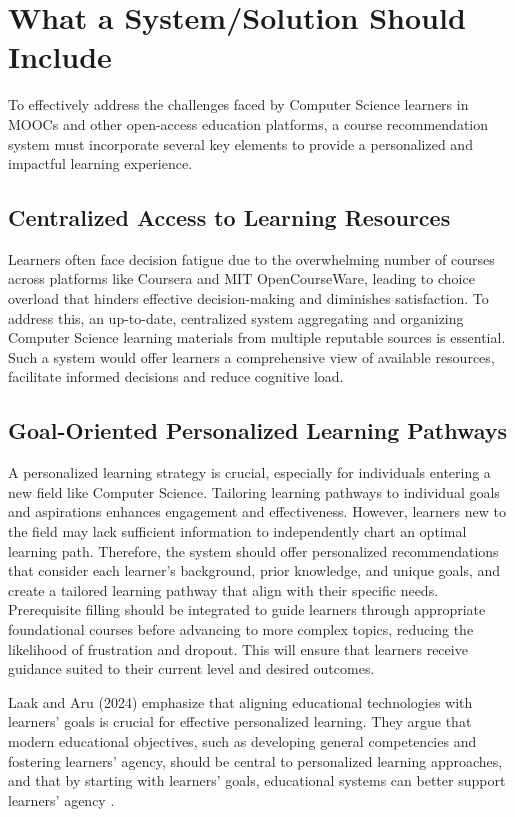 \section{What a System/Solution Should Include}

To effectively address the challenges faced by Computer Science learners in MOOCs and other open-access education platforms, a course recommendation system must incorporate several key elements to provide a personalized and impactful learning experience.

\subsection{Centralized Access to Learning Resources}

Learners often face decision fatigue due to the overwhelming number of courses across platforms like Coursera and MIT OpenCourseWare, leading to choice overload that hinders effective decision-making and diminishes satisfaction. To address this, an up-to-date, centralized system aggregating and organizing Computer Science learning materials from multiple reputable sources is essential. Such a system would offer learners a comprehensive view of available resources, facilitate informed decisions and reduce cognitive load.

\subsection{Goal-Oriented Personalized Learning Pathways}

A personalized learning strategy is crucial, especially for individuals entering a new field like Computer Science. Tailoring learning pathways to individual goals and aspirations enhances engagement and effectiveness. However, learners new to the field may lack sufficient information to independently chart an optimal learning path. Therefore, the system should offer personalized recommendations that consider each learner's background, prior knowledge, and unique goals, and create a tailored learning pathway that align with their specific needs. Prerequisite filling should be integrated to guide learners through appropriate foundational courses before advancing to more complex topics, reducing the likelihood of frustration and dropout. This will ensure that learners receive guidance suited to their current level and desired outcomes.

Laak and Aru (2024) emphasize that aligning educational technologies with learners' goals is crucial for effective personalized learning. They argue that modern educational objectives, such as developing general competencies and fostering learners' agency, should be central to personalized learning approaches, and that by starting with learners' goals, educational systems can better support learners' agency \cite{laak_ai_2024}.

